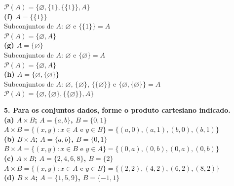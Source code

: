 \documentclass[12pt, a4paper]{article}
\begin{document}
\(\mathscr{P}(A) = \{\varnothing, \{1\}, \{\{1\}\}, A\}\) \\

\textbf{(f) \(A= \{\{1\}\}\)} \\

Subconjuntos de \(A\): \(\varnothing\) e \(\{\{1\}\} = A\) \\

\(\mathscr{P}(A) = \{\varnothing, A\}\) \\

\textbf{(g) \(A= \{\varnothing\}\)} \\

Subconjuntos de \(A\): \(\varnothing\) e \(\{\varnothing\} = A\) \\

\(\mathscr{P}(A) = \{\varnothing, A\}\) \\

\textbf{(h) \(A= \{\varnothing, \{\varnothing\}\}\)} \\

Subconjuntos de \(A\): \(\varnothing\), \(\{\varnothing\}\), \(\{\{\varnothing\}\}\) e \(\{\varnothing,\{\varnothing\}\} = A\) \\

\(\mathscr{P}(A) = \{\varnothing, \{\varnothing\}, \{\{\varnothing\}\}, A\}\) \\
\newpage

\textbf{5. Para os conjuntos dados, forme o produto cartesiano indicado.} \\

\textbf{(a) \(A \times B\); \(A = \{a,b\}\), \(B = \{0,1\}\)} \\

\(A \times B = \{(x,y): x \in A \text{ e } y \in B\} = \{(a, 0),(a,1),(b,0),(b,1)\}\) \\

\textbf{(b) \(B \times A\); \(A = \{a,b\}\), \(B = \{0,1\}\)} \\

\(B \times A = \{(x,y): x \in B \text{ e } y \in A\} = \{(0, a),(0,b),(0,a),(0,b)\}\) \\

\textbf{(c) \(A \times B\); \(A = \{2,4,6,8\}\), \(B = \{2\}\)} \\

\(A \times B = \{(x,y): x \in A \text{ e } y \in B\} = \{(2, 2),(4,2),(6,2),(8,2)\}\) \\

\textbf{(d) \(B \times A\); \(A = \{1,5,9\}\), \(B = \{-1,1\}\)} \\
\end{document}
